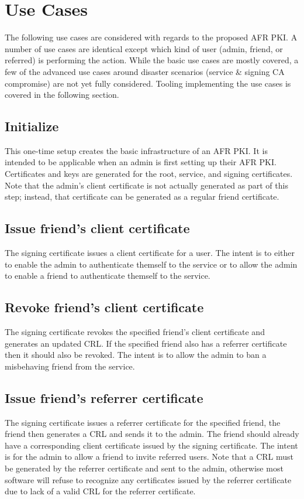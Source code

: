 \documentclass{article}
\begin{document}
\section{Use Cases}
The following use cases are considered with regards to the proposed AFR PKI.  A number of use cases are identical except which kind of user (admin, friend, or referred) is performing the action.  While the basic use cases are mostly covered, a few of the advanced use cases around disaster scenarios (service \& signing CA compromise) are not yet fully considered.  Tooling implementing the use cases is covered in the following section.

\subsection{Initialize}
\label{init}
This one-time setup creates the basic infrastructure of an AFR PKI.  It is intended to be applicable when an admin is first setting up their AFR PKI.  Certificates and keys are generated for the root, service, and signing certificates.  Note that the admin's client certificate is not actually generated as part of this step; instead, that certificate can be generated as a regular friend certificate.

\subsection{Issue friend's client certificate}
\label{sign-friend}
The signing certificate issues a client certificate for a user.  The intent is to either to enable the admin to authenticate themself to the service or to allow the admin to enable a friend to authenticate themself to the service.

\subsection{Revoke friend's client certificate}
\label{revoke-friend}
The signing certificate revokes the specified friend's client certificate and generates an updated CRL.  If the specified friend also has a referrer certificate then it should also be revoked.  The intent is to allow the admin to ban a misbehaving friend from the service.

\subsection{Issue friend's referrer certificate}
\label{sign-referrer}
The signing certificate issues a referrer certificate for the specified friend, the friend then generates a CRL and sends it to the admin.  The friend should already have a corresponding client certificate issued by the signing certificate.  The intent is for the admin to allow a friend to invite referred users.  Note that a CRL must be generated by the referrer certificate and sent to the admin, otherwise most software will refuse to recognize any certificates issued by the referrer certificate due to lack of a valid CRL for the referrer certificate.
\end{document}
